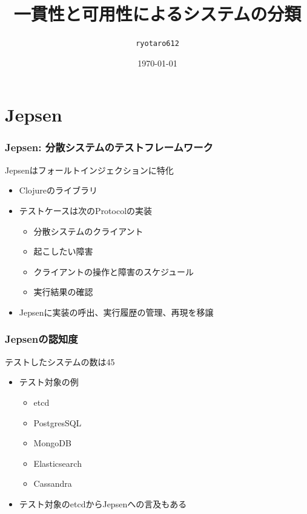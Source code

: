 \documentclass[unicode, 14pt, aspectratio=169]{beamer}
\date{\today}
\title{一貫性と可用性によるシステムの分類}
\author{\texttt{ryotaro612}}
\begin{document}
\begin{frame}
\titlepage
\end{frame}
\section{Jepsen}

\begin{frame}
  \frametitle{Jepsen: 分散システムのテストフレームワーク\supercite{jepsen}}
  {\large Jepsenはフォールトインジェクションに特化}
  \begin{itemize}
  \item Clojureのライブラリ
  \item テストケースは次のProtocol\supercite{clojure-protocols}の実装
    \begin{itemize}
    \item 分散システムのクライアント
    \item 起こしたい障害
    \item クライアントの操作と障害のスケジュール
    \item 実行結果の確認
    \end{itemize}
  \item Jepsenに実装の呼出、実行履歴の管理、再現を移譲
  \end{itemize}
\end{frame}
\begin{frame}
  \frametitle{Jepsenの認知度}
  {\large テストしたシステムの数は45\supercite{jepsen-analysis}}
  \begin{itemize}
  \item テスト対象の例
    \begin{itemize}
    \item etcd
    \item PostgresSQL
    \item MongoDB
    \item Elasticsearch
    \item Cassandra
    \end{itemize}
  \item テスト対象のetcdからJepsenへの言及もある\supercite{jepsen-etcd}
  \end{itemize}
\end{frame}
\end{document}
